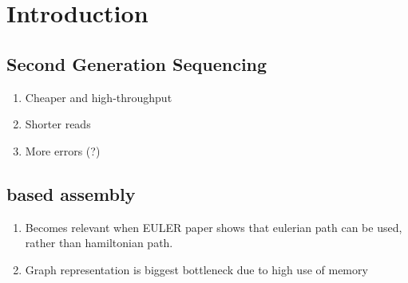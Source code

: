 \chapter{Introduction}

\section{Second Generation Sequencing}

\begin{enumerate}
\item Cheaper and high-throughput
\item Shorter reads
\item More errors (?)
\end{enumerate}

\section{\dBG based assembly}

\begin{enumerate}
\item Becomes relevant when EULER paper shows that eulerian path can be used, rather than hamiltonian path.
\item Graph representation is biggest bottleneck due to high use of memory
\end{enumerate}